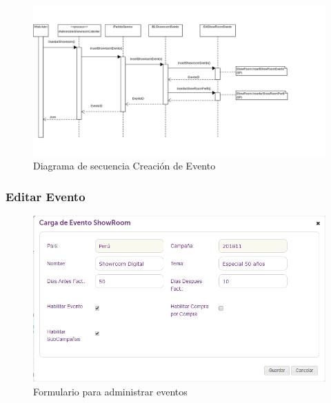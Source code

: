 \documentclass[a4paper,11pt]{paper}
\begin{document}
\begin{landscape}
\begin{figure}[!h]
\centering
\includegraphics[width=1.5\textwidth]{imgs/Eventos/NuevoEvento.png}
\caption{Diagrama de secuencia Creación de Evento}
\end{figure}
\end{landscape} 






\newpage
\subsubsection{Editar Evento}

\begin{figure}[h]
\centering
\includegraphics[width=1.0\textwidth]{imgs/Eventos/FormularioEditarEvento.png}
\caption{Formulario para administrar eventos}
\end{figure}
\end{document}
